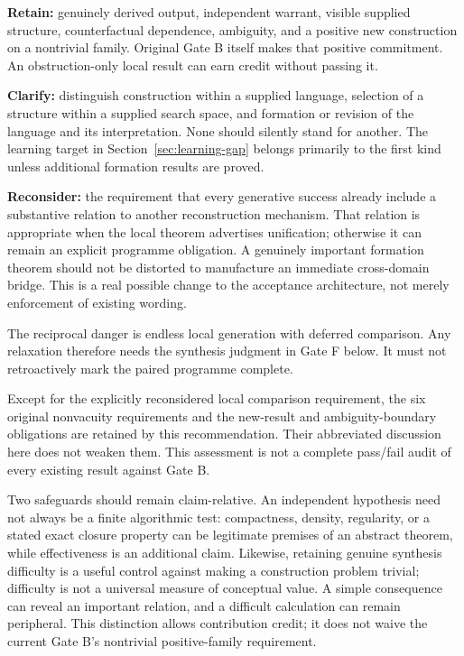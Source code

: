 \documentclass[11pt]{article}
\begin{document}
\textbf{Retain:} genuinely derived output, independent warrant, visible supplied structure, counterfactual dependence, ambiguity, and a positive new construction on a nontrivial family. Original Gate B itself makes that positive commitment. An obstruction-only local result can earn credit without passing it.

\textbf{Clarify:} distinguish construction within a supplied language, selection of a structure within a supplied search space, and formation or revision of the language and its interpretation. None should silently stand for another. The learning target in Section~\ref{sec:learning-gap} belongs primarily to the first kind unless additional formation results are proved.

\textbf{Reconsider:} the requirement that every generative success already include a substantive relation to another reconstruction mechanism. That relation is appropriate when the local theorem advertises unification; otherwise it can remain an explicit programme obligation. A genuinely important formation theorem should not be distorted to manufacture an immediate cross-domain bridge. This is a real possible change to the acceptance architecture, not merely enforcement of existing wording.

The reciprocal danger is endless local generation with deferred comparison. Any relaxation therefore needs the synthesis judgment in Gate F below. It must not retroactively mark the paired programme complete.

Except for the explicitly reconsidered local comparison requirement, the six original nonvacuity requirements and the new-result and ambiguity-boundary obligations are retained by this recommendation. Their abbreviated discussion here does not weaken them. This assessment is not a complete pass/fail audit of every existing result against Gate B.

Two safeguards should remain claim-relative. An independent hypothesis need not always be a finite algorithmic test: compactness, density, regularity, or a stated exact closure property can be legitimate premises of an abstract theorem, while effectiveness is an additional claim. Likewise, retaining genuine synthesis difficulty is a useful control against making a construction problem trivial; difficulty is not a universal measure of conceptual value. A simple consequence can reveal an important relation, and a difficult calculation can remain peripheral. This distinction allows contribution credit; it does not waive the current Gate B's nontrivial positive-family requirement.
\end{document}
